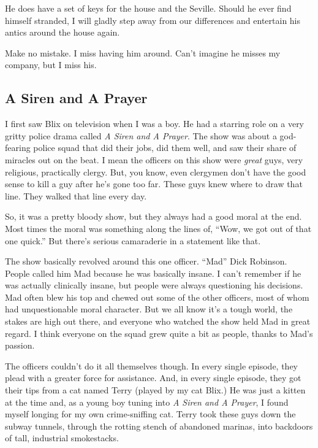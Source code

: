 \documentclass[10pt,twoside]{report}
\begin{document}
He does have a set of keys for the house and the Seville.  Should he
ever find himself stranded, I will gladly step away from our
differences and entertain his antics around the house again.

Make no mistake.  I miss having him around.  Can't imagine he misses
my company, but I miss his.



\subsection{A Siren and A Prayer}



I first saw Blix on television when I was a boy.  He had a starring
role on a very gritty police drama called {\em A Siren and A Prayer}.
The show was about a god-fearing police squad that did their jobs, did
them well, and saw their share of miracles out on the beat.  I mean
the officers on this show were {\em great} guys, very religious,
practically clergy.  But, you know, even clergymen don't have the good
sense to kill a guy after he's gone too far. These guys knew where to
draw that line.  They walked that line every day.

So, it was a pretty bloody show, but they always had a good moral at
the end.  Most times the moral was something along the lines of,
``Wow, we got out of that one quick.''  But there's serious
camaraderie in a statement like that.

The show basically revolved around this one officer.  ``Mad'' Dick
Robinson.  People called him Mad because he was basically insane.  I
can't remember if he was actually clinically insane, but people were
always questioning his decisions.  Mad often blew his top and chewed
out some of the other officers, most of whom had unquestionable moral
character.  But we all know it's a tough world, the stakes are high
out there, and everyone who watched the show held Mad in great regard.
I think everyone on the squad grew quite a bit as people, thanks to
Mad's passion.

The officers couldn't do it all themselves though.  In every single
episode, they plead with a greater force for assistance.  And, in
every single episode, they got their tips from a cat named Terry
(played by my cat Blix.)  He was just a kitten at the time and, as a
young boy tuning into {\em A Siren and A Prayer}, I found myself
longing for my own crime-sniffing cat. Terry took these guys down the
subway tunnels, through the rotting stench of abandoned marinas, into
backdoors of tall, industrial smokestacks.
\end{document}
